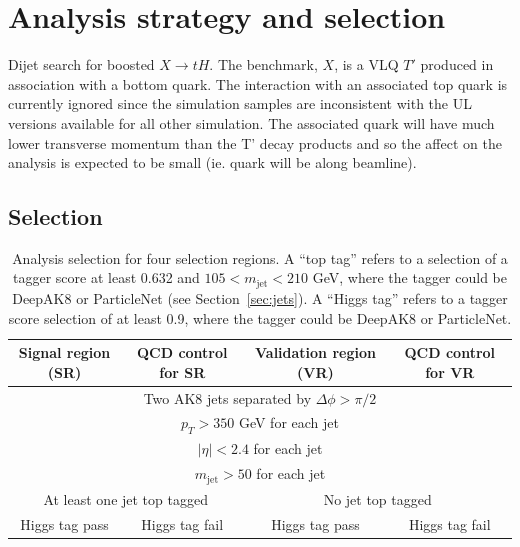 \documentclass[10pt]{article}
\begin{document}
\maketitle
\section{Analysis strategy and selection}

Dijet search for boosted $X \to tH$. The benchmark, $X$, is a VLQ $T'$ produced
in association with a bottom quark. The interaction with an associated top quark
is currently ignored since the simulation samples are inconsistent with the UL
versions available for all other simulation. The associated quark will have 
much lower transverse momentum than the T' decay products and so the affect on
the analysis is expected to be small (ie. quark will be along beamline).

\subsection{Selection}
\begin{table}[H]
    \centering
    \begin{tabular}{|c |c |c |c|}
        \hline
        Signal region (SR) & QCD control for SR & Validation region (VR) & QCD control for VR \\
        \hline
        \multicolumn{4}{|c|}{Two AK8 jets separated by $\Delta \phi > \pi/2$} \\
        \multicolumn{4}{|c|}{$p_T > 350$ GeV for each jet} \\
        \multicolumn{4}{|c|}{$|\eta| < 2.4$ for each jet} \\
        \multicolumn{4}{|c|}{$m_{\mathrm{jet}} > 50$ for each jet} \\
        \hline
        \multicolumn{2}{|c|}{At least one jet top tagged} & \multicolumn{2}{|c|}{No jet top tagged} \\
        \hline
        \multicolumn{1}{|c|}{Higgs tag pass} & \multicolumn{1}{|c|}{Higgs tag fail} & \multicolumn{1}{|c|}{Higgs tag pass} & \multicolumn{1}{|c|}{Higgs tag fail} \\
        \hline
    \end{tabular} 
    \label{table:selection}
    \caption{Analysis selection for four selection regions. A ``top tag'' refers to a selection of 
    a tagger score at least 0.632 and $105 < m_{\mathrm{jet}} < 210$ GeV, where the tagger could be DeepAK8
    or ParticleNet (see Section~\ref{sec:jets}). A ``Higgs tag'' refers to a tagger score selection of
    at least 0.9, where the tagger could be DeepAK8 or ParticleNet.}       
\end{table}
\end{document}
